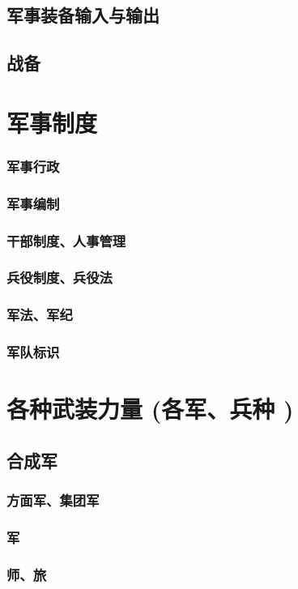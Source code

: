 \documentclass[UTF8]{../ApplicationUniverse}
\begin{document}
    \subsection{军事装备输入与输出}
    \subsection{战备}
\section{军事制度}
    \subsubsection{军事行政}
    \subsubsection{军事编制}
    \subsubsection{干部制度、人事管理}
    \subsubsection{兵役制度、兵役法}
    \subsubsection{军法、军纪}
    \subsubsection{军队标识}

\section{各种武装力量 (各军、兵种 )}
    \subsection{合成军}
        \subsubsection{方面军、集团军}
        \subsubsection{军}
        \subsubsection{师、旅}
\end{document}
